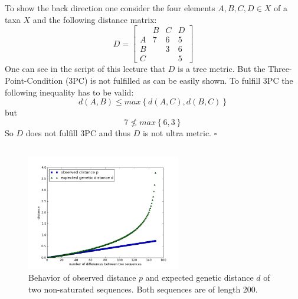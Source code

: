 \documentclass[%
   10pt,              %
   ngerman,           %
   a4paper,           %
   DIV11,             %
]{scrartcl}%
\begin{document}
To show the back direction one consider the four elements $A, B, C, D \in X$ of a taxa $X$ and the 
following distance matrix:
\begin{equation}
 D = \begin{bmatrix}
        & B & C & D \\
      A & 7 & 6 & 5 \\
      B &   & 3 & 6 \\
      C &   &   & 5
     \end{bmatrix} \nonumber
\end{equation}
One can see in the script of this lecture that $D$ is a tree metric. But the Three-Point-Condition 
(3PC) is not fulfilled as can be easily shown. To fulfill 3PC the following inequality has to be 
valid:
\begin{equation}
 d(A,B) \le max \left\lbrace d(A,C), d(B,C) \right\rbrace \nonumber
\end{equation}
but
\begin{equation}
 7 \nleq max \left\lbrace 6, 3  \right\rbrace \nonumber
\end{equation}
So $D$ does not fulfill 3PC and thus $D$ is not ultra metric. $\square$

\subsection{}

\begin{figure}[t]
 \centering
 \includegraphics[width=0.6\textwidth]{exec3bFigure.png}
 \caption{Behavior of observed distance $p$ and expected genetic distance $d$ of two non-saturated sequences. Both sequences are of length 200.}
 \label{fig:pdRelationship}
\end{figure}
\end{document}
